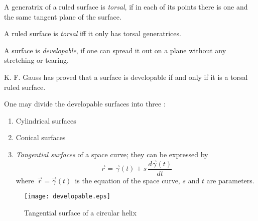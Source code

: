 \documentclass[12pt]{article}
\theoremstyle{definition}
\begin{document}
A generatrix of a ruled surface is {\em torsal}, if in each of its points there is one and the same tangent plane of the surface.

A ruled surface is {\em torsal} iff it only has torsal generatrices.

A surface is {\em developable}, if one can spread it out on a plane without any stretching or tearing.

K. F. Gauss has proved that a surface is developable if and only if it is a torsal  ruled surface.

One may divide the developable surfaces into three :
\begin{enumerate}
 \item Cylindrical surfaces
 \item Conical surfaces
 \item {\em Tangential surfaces} of a space curve; they can be expressed by
$$\vec{r} = \vec{\gamma}(t)+ s\,\frac{d\vec{\gamma}(t)}{dt}$$
where\, $\vec{r} = \vec{\gamma}(t)$\, is the equation of the space curve, $s$ and $t$ are parameters.
\end{enumerate}

\begin{figure}
\begin{center}
\texttt{[image: developable.eps]}
\end{center}
\caption{Tangential surface of a circular helix}
\end{figure}

\end{document}
